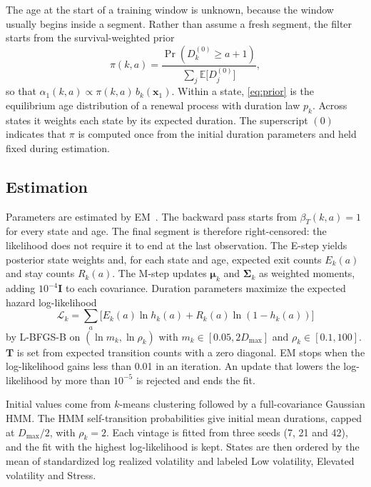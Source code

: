 \documentclass[conference]{IEEEtran}
\newcommand{\Dmax}{D_{\max}}
\begin{document}
The age at the start of a training window is unknown, because the window usually begins inside a segment. Rather than assume a fresh segment, the filter starts from the survival-weighted prior
\begin{equation}
\pi(k,a)=\frac{\Pr(D_k^{(0)}\geq a+1)}{\sum_{j}\mathbb{E}\big[D_j^{(0)}\big]},
\label{eq:prior}
\end{equation}
so that $\alpha_1(k,a)\propto \pi(k,a)\,b_k(\mathbf{x}_1)$. Within a state, \eqref{eq:prior} is the equilibrium age distribution of a renewal process with duration law $p_k$. Across states it weights each state by its expected duration. The superscript $(0)$ indicates that $\pi$ is computed once from the initial duration parameters and held fixed during estimation.

\subsection{Estimation}
Parameters are estimated by EM~\cite{dempster1977,guedon2003}. The backward pass starts from $\beta_T(k,a)=1$ for every state and age. The final segment is therefore right-censored: the likelihood does not require it to end at the last observation. The E-step yields posterior state weights and, for each state and age, expected exit counts $E_k(a)$ and stay counts $R_k(a)$. The M-step updates $\boldsymbol\mu_k$ and $\boldsymbol\Sigma_k$ as weighted moments, adding $10^{-4}\mathbf{I}$ to each covariance. Duration parameters maximize the expected hazard log-likelihood
\begin{equation}
\mathcal{L}_k=\sum_{a}\bigl[E_k(a)\ln h_k(a)+R_k(a)\ln(1-h_k(a))\bigr]
\label{eq:mstep}
\end{equation}
by L-BFGS-B on $(\ln m_k,\ln\rho_k)$ with $m_k\in[0.05, 2\Dmax]$ and $\rho_k\in[0.1,100]$. $\mathbf{T}$ is set from expected transition counts with a zero diagonal. EM stops when the log-likelihood gains less than 0.01 in an iteration. An update that lowers the log-likelihood by more than $10^{-5}$ is rejected and ends the fit.

Initial values come from $k$-means clustering followed by a full-covariance Gaussian HMM. The HMM self-transition probabilities give initial mean durations, capped at $\Dmax/2$, with $\rho_k=2$. Each vintage is fitted from three seeds (7, 21 and 42), and the fit with the highest log-likelihood is kept. States are then ordered by the mean of standardized log realized volatility and labeled Low volatility, Elevated volatility and Stress.
\end{document}
